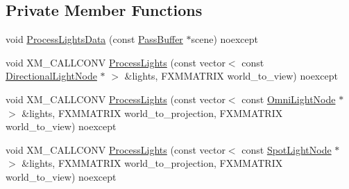 \subsection*{Private Member Functions}
\begin{DoxyCompactItemize}
\item 
void \hyperlink{structmage_1_1_l_buffer_a20635b79d83b07a07ffbdf7fd6a4861c}{Process\+Lights\+Data} (const \hyperlink{structmage_1_1_pass_buffer}{Pass\+Buffer} $\ast$scene) noexcept
\item 
void X\+M\+\_\+\+C\+A\+L\+L\+C\+O\+NV \hyperlink{structmage_1_1_l_buffer_a39bbdefed2d1dffb8f1b29a0924f3daa}{Process\+Lights} (const vector$<$ const \hyperlink{namespacemage_a7637b5351fc0f66a10badd80ebb35899}{Directional\+Light\+Node} $\ast$ $>$ \&lights, F\+X\+M\+M\+A\+T\+R\+IX world\+\_\+to\+\_\+view) noexcept
\item 
void X\+M\+\_\+\+C\+A\+L\+L\+C\+O\+NV \hyperlink{structmage_1_1_l_buffer_a82879fbde4b5519031af9ffa13eb0e62}{Process\+Lights} (const vector$<$ const \hyperlink{namespacemage_a1724c6e6b6b5ba535cdd967cbbb4a669}{Omni\+Light\+Node} $\ast$ $>$ \&lights, F\+X\+M\+M\+A\+T\+R\+IX world\+\_\+to\+\_\+projection, F\+X\+M\+M\+A\+T\+R\+IX world\+\_\+to\+\_\+view) noexcept
\item 
void X\+M\+\_\+\+C\+A\+L\+L\+C\+O\+NV \hyperlink{structmage_1_1_l_buffer_a86cc56a08308047347002cf6d39cc3b7}{Process\+Lights} (const vector$<$ const \hyperlink{namespacemage_aeed5dee4ff6c591eabb0e9114256df4a}{Spot\+Light\+Node} $\ast$ $>$ \&lights, F\+X\+M\+M\+A\+T\+R\+IX world\+\_\+to\+\_\+projection, F\+X\+M\+M\+A\+T\+R\+IX world\+\_\+to\+\_\+view) noexcept
\end{DoxyCompactItemize}

